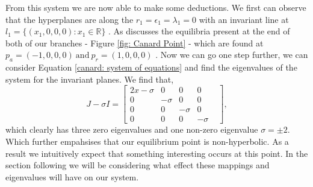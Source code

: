 From this system we are now able to make some deductions. We first can observe that the hyperplanes are along the $r_1=\epsilon_1=\lambda_1=0$ with an invariant line at $l_1=\{(x_1,0,0,0): x_1\in\mathbb{R}\}$ \citep{krupa2001}. As \citet{krupa2001} discusses the equilibria present at the end of both of our branches - Figure \ref{fig: Canard Point} - which are found at $p_a=(-1,0,0,0) \ \text{and} \ p_r=(1,0,0,0)$ \citep{krupa2001}. Now we can go one step further, we can consider Equation \ref{canard: system of equations} and find the eigenvalues of the system for the invariant planes. We find that, 
\begin{equation}
J-\sigma I= \begin{bmatrix}
2x-\sigma & 0 & 0 & 0  \\
0 & -\sigma & 0 & 0&\\
0 & 0 & -\sigma & 0 \\
0 & 0 & 0 & -\sigma
\end{bmatrix},
\end{equation}
which clearly has three zero eigenvalues and one non-zero eigenvalue $\sigma=\pm 2$. Which further empahsises that our equilibrium point is non-hyperbolic. As a result we intuitively expect that something interesting occurs at this point. In the section following we will be considering what effect these mappings and eigenvalues will have on our system.


